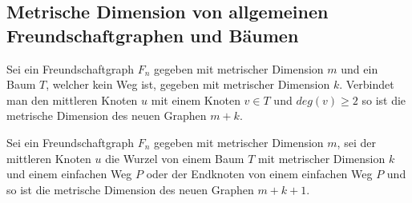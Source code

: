 \subsection{Metrische Dimension von allgemeinen Freundschaftgraphen und Bäumen}
\label{amal}
\begin{lem}
Sei ein Freundschaftgraph $F_n$ gegeben mit metrischer Dimension $m$ und ein Baum $T$, welcher kein Weg ist, gegeben mit metrischer Dimension $k$. Verbindet man den mittleren Knoten $u$ mit einem Knoten $v \in T$ und $deg(v)\geq 2$ so ist die metrische Dimension des neuen Graphen $m+k$.
\end{lem}

\begin{lem}
Sei ein Freundschaftgraph $F_n$ gegeben mit metrischer Dimension $m$, sei der mittleren Knoten $u$ die Wurzel von einem Baum $T$ mit metrischer Dimension $k$ und einem einfachen Weg $P$ oder der Endknoten von einem einfachen Weg $P$ und so ist die metrische Dimension des neuen Graphen $m+k+1$.
\end{lem}
\newpage
\vspace{-2mm}

